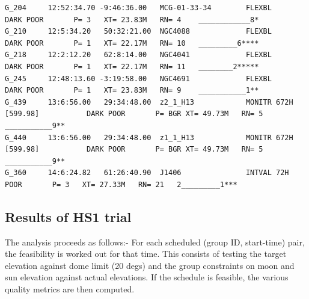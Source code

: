 \begin{landscape}
\begin{verbatim}
G_204     12:52:34.70 -9:46:36.00   MCG-01-33-34        FLEXBL                         DARK POOR       P= 3   XT= 23.83M   RN= 4    ____________8*
G_210     12:5:34.20   50:32:21.00  NGC4088             FLEXBL                         DARK POOR       P= 1   XT= 22.17M   RN= 10   _________6****
G_218     12:2:12.20   62:8:14.00   NGC4041             FLEXBL                         DARK POOR       P= 1   XT= 22.17M   RN= 11   ________2*****
G_245     12:48:13.60 -3:19:58.00   NGC4691             FLEXBL                         DARK POOR       P= 1   XT= 23.83M   RN= 9    ___________1**
G_439     13:6:56.00   29:34:48.00  z2_1_H13            MONITR 672H [599.98]           DARK POOR       P= BGR XT= 49.73M   RN= 5    ___________9**
G_440     13:6:56.00   29:34:48.00  z1_1_H13            MONITR 672H [599.98]           DARK POOR       P= BGR XT= 49.73M   RN= 5    ___________9**
G_360     14:6:24.82   61:26:40.90  J1406               INTVAL 72H                          POOR       P= 3   XT= 27.33M   RN= 21   2_________1***
\end{verbatim}
\end{landscape}
\normalsize




\subsection{Results of HS1 trial}
The analysis proceeds as follows:- For each scheduled (group ID, start-time) pair, the feasibility is worked out for that time. This consists of testing the target elevation against dome limit (20 degs) and the group constraints on moon and sun elevation against actual elevations. If the schedule is feasible, the various quality metrics are then computed.

